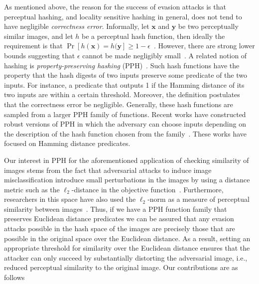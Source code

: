 \documentclass[pdflatex,sn-mathphys-num]{sn-jnl}
\theoremstyle{definition}
\newcommand{\vtr}[1]{\mathbf{#1}}
\begin{document}
As mentioned above, the reason for the success of evasion attacks is that perceptual hashing, and locality sensitive hashing in general, does not tend to have negligible \emph{correctness error}. Informally, let $\vtr{x}$ and $\vtr{y}$ be two perceptually similar images, and let $h$ be a perceptual hash function, then ideally the requirement is that $\Pr[h(\vtr{x}) = h(\vtr{y}] \geq 1 - \epsilon$~\cite{zauner2010ph-thesis, hao2021pph-attack, holmgren2022nearly}. However, there are strong lower bounds suggesting that $\epsilon$ cannot be made negligibly small~\cite{o2014lowerbound-ph, holmgren2022nearly}. A related notion of hashing is \emph{property-preserving hashing} (PPH)~\cite{boyle2018adversarially}. Such hash functions have the property that the hash digests of two inputs preserve some predicate of the two inputs. For instance, a predicate that outputs 1 if the Hamming distance of its two inputs are within a certain threshold. Moreover, the definition postulates that the correctness error be negligible. Generally, these hash functions are sampled from a larger PPH family of functions. Recent works have constructed robust versions of PPH in which the adversary can choose inputs depending on the description of the hash function chosen from the family~\cite{boyle2018adversarially, holmgren2022nearly, fleischhacker2021robust, fleischhacker2022property}. These works have focused on Hamming distance predicates. 

Our interest in PPH for the aforementioned application of checking similarity of images stems from the fact that adversarial attacks to induce image misclassification introduce small perturbations in the images by using a distance metric such as the $\ell_2$-distance in the objective function~\cite{madry2018towards, carlini2017l2}. Furthermore, researchers in this space have also used the $\ell_2$-norm as a measure of perceptual similarity between images~\cite{hao2021pph-attack, carlini2017l2}. Thus, if we have a PPH function family that preserves Euclidean distance predicates we can be assured that any evasion attacks possible in the hash space of the images are precisely those that are possible in the original space over the Euclidean distance. As a result, setting an appropriate threshold for similarity over the Euclidean distance ensures that the attacker can only succeed by substantially distorting the adversarial image, i.e., reduced perceptual similarity to the original image. Our contributions are as follows
\end{document}
